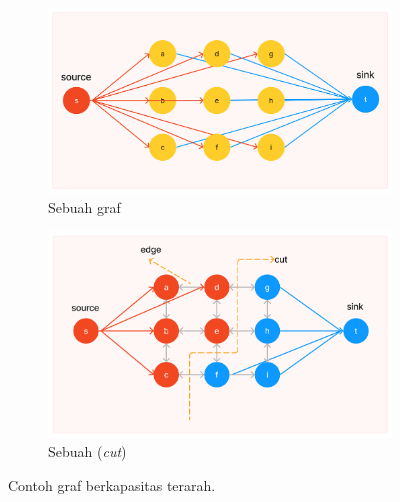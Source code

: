 

\begin{figure}[H]
	\centering
	  \begin{subfigure}{.5\textwidth}
		\centering{}
		\includegraphics[width=\textwidth]{gambar/cth-graph-1.png}
		\caption{Sebuah graf}
	  \end{subfigure} \hfill
	  \begin{subfigure}{.5\textwidth}
		\centering{}
		\includegraphics[width=\textwidth]{gambar/cth-graph-2.png}
		\caption{Sebuah (\emph{cut})}
	  \end{subfigure}  
	\caption{
	  Contoh graf berkapasitas terarah.
	  }
	\label{img:contoh_mincut}
  
  \end{figure}

